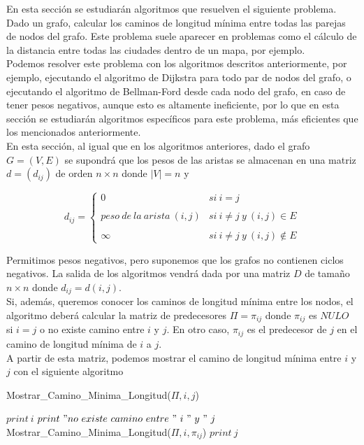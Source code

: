 En esta sección se estudiarán algoritmos que resuelven el siguiente problema. \\

Dado un grafo, calcular los caminos de longitud mínima entre todas las parejas de nodos del grafo. Este problema suele aparecer en problemas como el cálculo de la distancia entre todas las ciudades dentro de un mapa, por ejemplo. \\

Podemos resolver este problema con los algoritmos descritos anteriormente, por ejemplo, ejecutando el algoritmo de Dijkstra para todo par de nodos del grafo, o ejecutando el algoritmo de Bellman-Ford desde cada nodo del grafo, en caso de tener pesos negativos, aunque esto es altamente ineficiente, por lo que en esta sección se estudiarán algoritmos específicos para este problema, más eficientes que los mencionados anteriormente. \\

En esta sección, al igual que en los algoritmos anteriores, dado el grafo $G=(V,E)$ se supondrá que los pesos de las aristas se almacenan en una matriz $d=(d_{ij})$ de orden $n\times n$ donde $|V|=n$ y

$$d_{ij}= \left\{ \begin{array}{lcc}
	0 &   si\ i=j \\
	\\ peso\ de\ la\ arista\ (i,j) &  si\ i\neq j\ y\ (i,j)\in E \\
	\\ \infty & si\ i\neq j\ y\ (i,j)\notin E
\end{array}
\right.$$

Permitimos pesos negativos, pero suponemos que los grafos no contienen ciclos negativos. La salida de los algoritmos vendrá dada por una matriz $D$ de tamaño $n\times n$ donde $d_{ij}=d(i,j)$. \\

Si, además, queremos conocer los caminos de longitud mínima entre los nodos, el algoritmo deberá calcular la matriz de predecesores $\Pi=\pi_{ij}$  donde $\pi_{ij}$ es $NULO$ si $i=j$ o no existe camino entre $i$ y $j$. En otro caso, $\pi_{ij}$ es el predecesor de $j$ en el camino de longitud mínima de $i$ a $j$. \\

A partir de esta matriz, podemos mostrar el camino de longitud mínima entre $i$ y $j$ con el siguiente algoritmo

\begin{breakablealgorithm}
	\caption{Mostrar\_Camino\_Minima\_Longitud($\Pi,i,j$)}
	\begin{algorithmic}[1]
			\State $print\ i$
			\State $print\ "no\ existe\ camino\ entre\ "\ i\ "\ y\ "\ j$
		\Else
			\State Mostrar\_Camino\_Minima\_Longitud($\Pi,i,\pi_{ij}$)
		\EndIf
		\State $print\ j$
	\end{algorithmic}
\end{breakablealgorithm}

